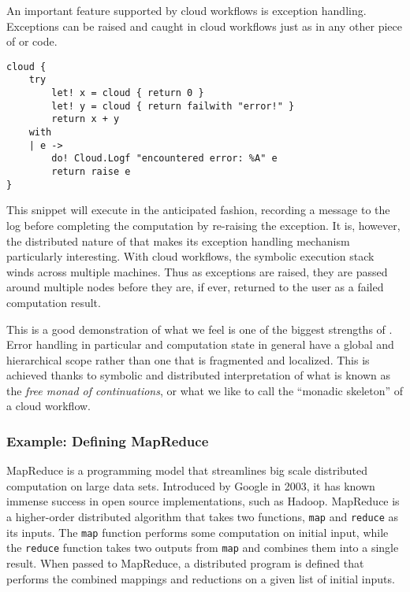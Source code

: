 An important feature supported by cloud workflows is exception handling. 
Exceptions can be raised and caught in cloud workflows just as in any other piece 
of \fsharp{} or \dotnet{} code. 
\begin{lstlisting}
cloud {
    try
        let! x = cloud { return 0 }
        let! y = cloud { return failwith "error!" }
        return x + y
    with 
    | e ->
        do! Cloud.Logf "encountered error: %A" e
        return raise e
}
\end{lstlisting}
This snippet will execute in the anticipated fashion, recording a message to the log
before completing the computation by re-raising the exception.
It is, however, the distributed nature of \mbrace{} that makes its exception 
handling mechanism particularly interesting. With cloud workflows, the symbolic execution
stack winds across multiple machines. Thus as exceptions are raised, they are passed
around multiple nodes before they are, if ever, returned to the user as a failed
computation result.

This is a good demonstration of what we feel is one of the biggest strengths of \mbrace.
Error handling in particular and computation state in general have a global and hierarchical
scope rather than one that is fragmented and localized.
This is achieved thanks to symbolic and distributed interpretation of what is known as the 
\emph{free monad of continuations}\cite{data-types-ala-carte, scala-trampolines}, 
or what we like to call the ``monadic skeleton'' of a cloud workflow.


\subsubsection*{Example: Defining MapReduce}

MapReduce is a programming model that streamlines big scale distributed computation
on large data sets. Introduced by Google in 2003, it has known immense success in open
source implementations, such as Hadoop. MapReduce is a higher-order distributed algorithm
that takes two functions, \texttt{map} and \texttt{reduce} as its inputs. The \texttt{map}
function performs some computation on initial input, while the \texttt{reduce} function
takes two outputs from \texttt{map} and combines them into a single result. 
When passed to MapReduce, a distributed program is defined that performs the combined 
mappings and reductions on a given list of initial inputs.

